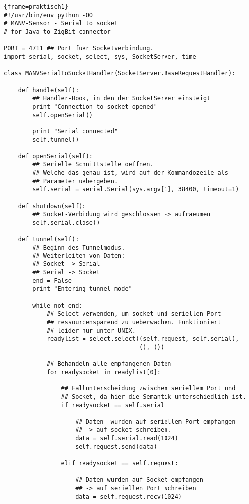 \begin{lstlisting}{frame=praktisch1}
#!/usr/bin/env python -OO
# MANV-Sensor - Serial to socket
# for Java to ZigBit connector 

PORT = 4711 ## Port fuer Socketverbindung.
import serial, socket, select, sys, SocketServer, time

class MANVSerialToSocketHandler(SocketServer.BaseRequestHandler):

    def handle(self):
        ## Handler-Hook, in den der SocketServer einsteigt
        print "Connection to socket opened"
        self.openSerial()

        print "Serial connected"
        self.tunnel()

    def openSerial(self):
        ## Serielle Schnittstelle oeffnen.
        ## Welche das genau ist, wird auf der Kommandozeile als 
        ## Parameter uebergeben.
        self.serial = serial.Serial(sys.argv[1], 38400, timeout=1)

    def shutdown(self):
        ## Socket-Verbidung wird geschlossen -> aufraeumen
        self.serial.close()

    def tunnel(self):
        ## Beginn des Tunnelmodus.
        ## Weiterleiten von Daten:
        ## Socket -> Serial
        ## Serial -> Socket
        end = False
        print "Entering tunnel mode"

        while not end:
            ## Select verwenden, um socket und seriellen Port 
            ## ressourcensparend zu ueberwachen. Funktioniert
            ## leider nur unter UNIX.
            readylist = select.select((self.request, self.serial),
                                      (), ())

            ## Behandeln alle empfangenen Daten
            for readysocket in readylist[0]:

                ## Fallunterscheidung zwischen seriellem Port und 
                ## Socket, da hier die Semantik unterschiedlich ist.
                if readysocket == self.serial:

                    ## Daten  wurden auf seriellem Port empfangen
                    ## -> auf socket schreiben.
                    data = self.serial.read(1024)
                    self.request.send(data)

                elif readysocket == self.request:

                    ## Daten wurden auf Socket empfangen
                    ## -> auf seriellen Port schreiben
                    data = self.request.recv(1024)


\end{lstlisting}
